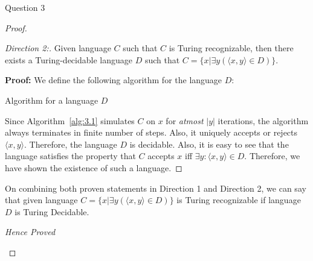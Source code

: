 \begin{solution}{Question 3}
\begin{proof}
      \begin{proof}[Direction 2:]
        Given language $C$ such that $C$ is Turing recognizable, then there exists a Turing-decidable language $D$ such that $C = \{ x | \exists y (\langle x,y \rangle \in D) \}$.\par
        \textbf{Proof:}
        We define the following algorithm for the language $D$:
        \begin{algorithm}[H]
          \caption{Algorithm for a language $D$}
          \label{alg:3.1}
          \begin{algorithmic}[1]
                
              \Else{}
              \EndIf{}
            \EndProcedure{}
          \end{algorithmic}
        \end{algorithm}
        Since Algorithm~\ref{alg:3.1} simulates $C$ on $x$ for \textit{atmost} $|y|$ iterations, the algorithm always terminates in finite number of steps. Also, it uniquely accepts or rejects $\langle x, y\rangle$. Therefore, the language $D$ is decidable. Also, it is easy to see that the language satisfies the property that $C$ accepts $x$ iff $\exists y: \langle x, y\rangle \in D$. Therefore, we have shown the existence of such a language.
      \end{proof}
      
      On combining both proven statements in Direction 1 and Direction 2, we can say that given language $C = \{ x | \exists y (\langle x,y \rangle \in D) \}$ is Turing recognizable if language $D$ is Turing Decidable.
      \begin{center}
          \textit{Hence Proved}
      \end{center}
    \end{proof}
\end{solution}
